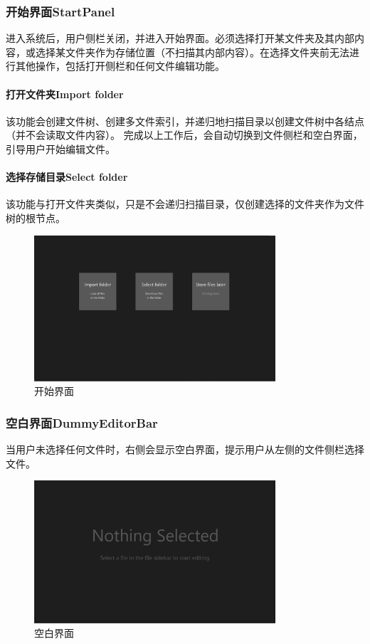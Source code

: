 \documentclass[scheme = chinese]{ctexart}
\begin{document}
\subsubsection{开始界面StartPanel}
进入系统后，用户侧栏关闭，并进入开始界面。必须选择打开某文件夹及其内部内容，或选择某文件夹作为存储位置（不扫描其内部内容）。在选择文件夹前无法进行其他操作，包括打开侧栏和任何文件编辑功能。

\paragraph{打开文件夹Import folder}
该功能会创建文件树、创建多文件索引，并递归地扫描目录以创建文件树中各结点（并不会读取文件内容）。
完成以上工作后，会自动切换到文件侧栏和空白界面，引导用户开始编辑文件。

\paragraph{选择存储目录Select folder}
该功能与打开文件夹类似，只是不会递归扫描目录，仅创建选择的文件夹作为文件树的根节点。

\begin{figure}[h]
    \centering
    \includegraphics[width=0.8\textwidth]{images/StartPanel.png}
    \caption{开始界面}
\end{figure}

\subsubsection{空白界面DummyEditorBar}
当用户未选择任何文件时，右侧会显示空白界面，提示用户从左侧的文件侧栏选择文件。

\begin{figure}[h]
    \centering
    \includegraphics[width=0.8\textwidth]{images/DummyEditorBar.png}
    \caption{空白界面}
\end{figure}
\end{document}
